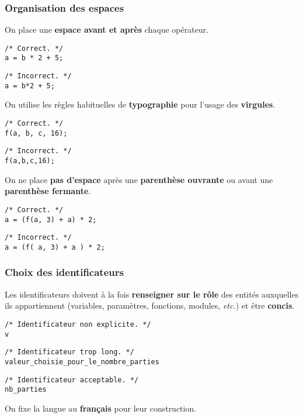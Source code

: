 \begin{frame}[fragile] \frametitle{Organisation des espaces}
On place une {\bf espace avant et après} chaque opérateur.
\begin{multicols}{2}
\begin{lstlisting}[showspaces=true]
/* Correct. */
a = b * 2 + 5;
\end{lstlisting}

\begin{lstlisting}[showspaces=true]
/* Incorrect. */
a = b*2 + 5;
\end{lstlisting}
\end{multicols}
\medskip

On utilise les règles habituelles de {\bf typographie} pour l'usage des 
{\bf virgules}.
\begin{multicols}{2}
\begin{lstlisting}[showspaces=true]
/* Correct. */
f(a, b, c, 16);
\end{lstlisting}

\begin{lstlisting}[showspaces=true]
/* Incorrect. */
f(a,b,c,16);
\end{lstlisting}
\end{multicols}
\medskip

On ne place {\bf pas d'espace} après une {\bf parenthèse ouvrante} ou 
avant une {\bf parenthèse fermante}.
\begin{multicols}{2}
\begin{lstlisting}[showspaces=true]
/* Correct. */
a = (f(a, 3) + a) * 2; 
\end{lstlisting}

\begin{lstlisting}[showspaces=true]
/* Incorrect. */
a = (f( a, 3) + a ) * 2;
\end{lstlisting}
\end{multicols}
\end{frame}

\begin{frame}[fragile] \frametitle{Choix des identificateurs}
Les \alert{identificateurs} doivent à la fois {\bf renseigner sur le rôle} 
des entités auxquelles ils appartiennent (variables, paramètres, 
fonctions, modules, {\em etc.}) et être {\bf concis}. 
\begin{lstlisting}
/* Identificateur non explicite. */
v
\end{lstlisting}

\begin{lstlisting}
/* Identificateur trop long. */
valeur_choisie_pour_le_nombre_parties
\end{lstlisting}

\begin{lstlisting}
/* Identificateur acceptable. */
nb_parties
\end{lstlisting}
\medskip

On fixe la langue au {\bf français} pour leur construction.
\end{frame}

